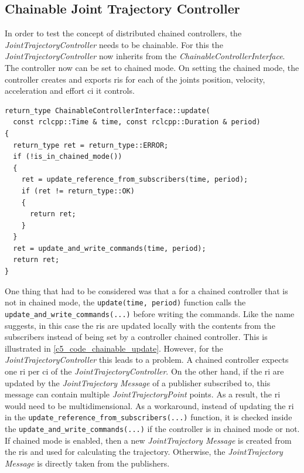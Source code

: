\subsection{Chainable Joint Trajectory Controller}
In order to test the concept of distributed chained controllers, the \textit{JointTrajectoryController} needs to be chainable. For this the \textit{JointTrajectoryController} now inherits from the \textit{ChainableControllerInterface}. The controller now can be set to chained mode. On setting the chained mode, the controller creates and exports \glspl{ri} for each of the joints position, velocity, acceleration and effort \gls{ci} it controls.\newline
\lstset{language=C++,basicstyle=\small}
\begin{lstlisting}[caption=Update function for \textit{ChainableControllerInterface}.,label=c5_code_chainable_update]
return_type ChainableControllerInterface::update(
  const rclcpp::Time & time, const rclcpp::Duration & period)
{
  return_type ret = return_type::ERROR;
  if (!is_in_chained_mode())
  {
    ret = update_reference_from_subscribers(time, period);
    if (ret != return_type::OK)
    {
      return ret;
    }
  }
  ret = update_and_write_commands(time, period);
  return ret;
}
\end{lstlisting}
One thing that had to be considered was that a for a chained controller that is not in chained mode, the \lstset{language=C++,basicstyle=\small\ttfamily}\lstinline{update(time, period)} function calls the \lstset{language=C++,basicstyle=\small\ttfamily}\lstinline{update_and_write_commands(...)} before writing the commands. Like the name suggests, in this case the \glspl{ri} are updated locally with the contents from the subscribers instead of being set by a controller chained controller. This is illustrated in \autoref{c5_code_chainable_update}. However, for the \textit{JointTrajectoryController} this leads to a problem. A chained controller expects one \gls{ri} per \gls{ci} of the \textit{JointTrajectoryController}. On the other hand, if the \gls{ri} are updated by the \textit{JointTrajectory Message} of a publisher subscribed to, this message can contain multiple \textit{JointTrajectoryPoint} points. As a result, the \gls{ri} would need to be multidimensional. \newline
As a workaround, instead of updating the \gls{ri} in the \lstset{language=C++,basicstyle=\small\ttfamily, breaklines=true}\lstinline{update_reference_from_subscribers(...)} function, it is checked inside the \lstset{language=C++,basicstyle=\small\ttfamily}\lstinline{update_and_write_commands(...)} if the controller is in chained mode or not. If chained mode is enabled, then a new \textit{JointTrajectory Message} is created from the \glspl{ri} and used for calculating the trajectory. Otherwise, the \textit{JointTrajectory Message} is directly taken from the publishers.

